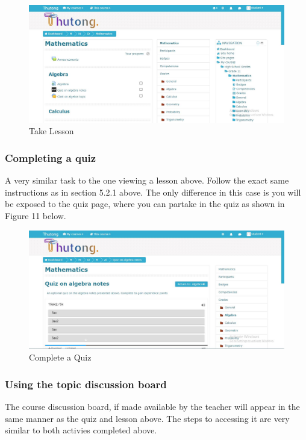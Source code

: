 \documentclass[12pt,a4paper]{article}
\begin{document}
			 	\begin{figure}[h]
			 		\centering
			 		\includegraphics[width=1\textwidth]{images/courseHome.JPG}
			 		\caption{Take Lesson}
			 		\label{Figure 10}
			 	\end{figure}
	 		
	 		\subsubsection{Completing a quiz}
		 		A very similar task to the one viewing a lesson above. Follow the exact same instructions as in section 5.2.1 above. The only difference in this case is you will be exposed to the quiz page, where you can partake in the quiz as shown in Figure 11 below.
		 		
		 		\begin{figure}[h]
		 			\centering
		 			\includegraphics[width=1\textwidth]{images/takeQuiz.JPG}
		 			\caption{Complete a Quiz}
		 			\label{Figure 11}
		 		\end{figure}
	 		
	 		\subsubsection{Using the topic discussion board}
	 			The course discussion board, if made available by the teacher will appear in the same manner as the quiz and lesson above. The steps to accessing it are very similar to both activies completed above.
	 			
\end{document}
